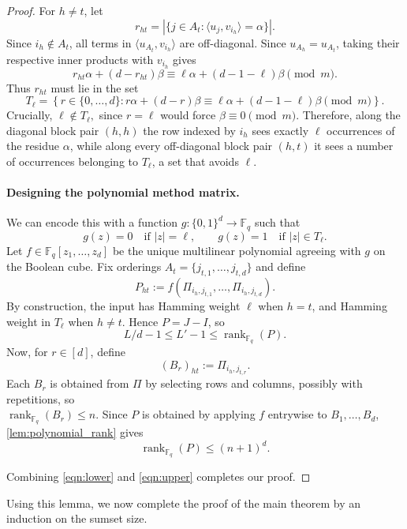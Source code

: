 \documentclass[11pt]{article}
\theoremstyle{definition}
\begin{document}
\begin{proof}
For $h\ne t$, let
\[
r_{ht}
=
\left|\{j\in A_t:\langle u_j,v_{i_h}\rangle=\alpha\}\right|.
\]
Since $i_h\notin A_t$, all terms in
$\langle u_{A_t},v_{i_h}\rangle$ are off-diagonal. Since
$u_{A_h}=u_{A_t}$, taking their respective inner products with $v_{i_h}$ gives
\[
r_{ht}\alpha+(d-r_{ht})\beta
\equiv
\ell\alpha+(d-1-\ell)\beta
\pmod m.
\]
Thus $r_{ht}$ must lie in the set
\[
T_\ell
=
\left\{
r\in\{0,\ldots,d\}:
r\alpha+(d-r)\beta
\equiv
\ell\alpha+(d-1-\ell)\beta
\pmod m
\right\}.
\]
Crucially, $\ell\notin T_\ell,$
since $r=\ell$ would force $\beta\equiv0\pmod m$. Therefore, along the diagonal block pair $(h,h)$ the row indexed by $i_h$
sees exactly $\ell$ occurrences of the residue $\alpha$, while along every
off-diagonal block pair $(h,t)$ it sees a number of occurrences belonging to
$T_\ell$, a set that avoids $\ell$.

\paragraph{Designing the polynomial method matrix.}  We can encode this with a function $g:\{0,1\}^d\to\mathbb F_q$ such that
\[
g(z)=0\quad\text{if }|z|=\ell,
\qquad
g(z)=1\quad\text{if }|z|\in T_\ell.
\] 
Let $f\in\mathbb F_q[z_1,\ldots,z_d]$ be the unique multilinear polynomial agreeing with $g$ on the Boolean cube. Fix orderings $A_t=\{j_{t,1},\ldots,j_{t,d}\}$ and define
\[
P_{ht}:=
f(\Pi_{i_h,j_{t,1}},\ldots,\Pi_{i_h,j_{t,d}}).
\]
By construction, the input has Hamming weight $\ell$ when $h=t$, and
Hamming weight in $T_\ell$ when $h\ne t$. Hence $P=J-I$, so
\begin{equation} \label{eqn:lower}
L/d - 1\leq L'-1\le \operatorname{rank}_{\mathbb F_q}(P).
\end{equation}
Now, for $r\in[d]$, define
\[
(B_r)_{ht}:=\Pi_{i_h,j_{t,r}}.
\]
Each $B_r$ is obtained from $\Pi$ by selecting rows and columns, possibly with
repetitions, so \\ $\operatorname{rank}_{\mathbb F_q}(B_r)\le n$. Since $P$ is
obtained by applying $f$ entrywise to $B_1,\ldots,B_d$, \cref{lem:polynomial_rank}
gives
\begin{equation} \label{eqn:upper}
\operatorname{rank}_{\mathbb F_q}(P)\le (n+1)^d.
\end{equation}

Combining \cref{eqn:lower} and \cref{eqn:upper} completes our proof.
\end{proof}

Using this lemma, we now complete the proof of the main theorem by an induction on the sumset size.
\end{document}

